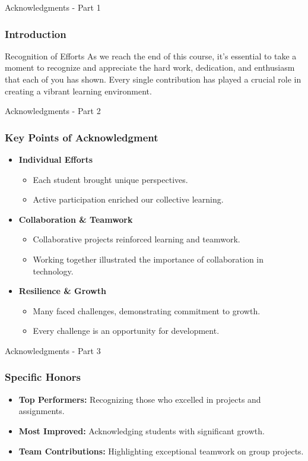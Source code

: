 \documentclass[aspectratio=169]{beamer}
\begin{document}
\begin{frame}[fragile]{Acknowledgments - Part 1}
    \frametitle{Introduction}
    \begin{block}{Recognition of Efforts}
        As we reach the end of this course, it’s essential to take a moment to recognize and appreciate the hard work, dedication, and enthusiasm that each of you has shown. Every single contribution has played a crucial role in creating a vibrant learning environment.
    \end{block}
\end{frame}

\begin{frame}[fragile]{Acknowledgments - Part 2}
    \frametitle{Key Points of Acknowledgment}
    \begin{itemize}
        \item \textbf{Individual Efforts}
            \begin{itemize}
                \item Each student brought unique perspectives.
                \item Active participation enriched our collective learning.
            \end{itemize}
        \item \textbf{Collaboration \& Teamwork}
            \begin{itemize}
                \item Collaborative projects reinforced learning and teamwork.
                \item Working together illustrated the importance of collaboration in technology.
            \end{itemize}
        \item \textbf{Resilience \& Growth}
            \begin{itemize}
                \item Many faced challenges, demonstrating commitment to growth.
                \item Every challenge is an opportunity for development.
            \end{itemize}
    \end{itemize}
\end{frame}

\begin{frame}[fragile]{Acknowledgments - Part 3}
    \frametitle{Specific Honors}
    \begin{itemize}
        \item \textbf{Top Performers:} Recognizing those who excelled in projects and assignments.
        \item \textbf{Most Improved:} Acknowledging students with significant growth.
        \item \textbf{Team Contributions:} Highlighting exceptional teamwork on group projects.
    \end{itemize}
\end{frame}
\end{document}
